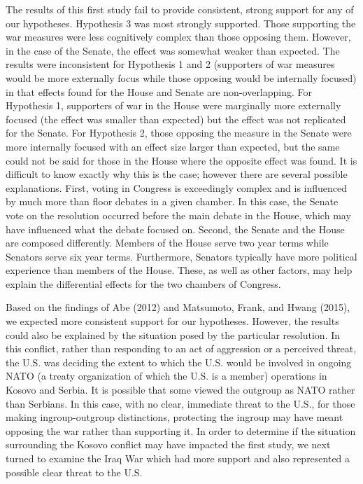 \documentclass[
  english,
  ,man,floatsintext]{apa6}
\begin{document}
The results of this first study fail to provide consistent, strong support for any of our hypotheses. Hypothesis 3 was most strongly supported. Those supporting the war measures were less cognitively complex than those opposing them. However, in the case of the Senate, the effect was somewhat weaker than expected. The results were inconsistent for Hypothesis 1 and 2 (supporters of war measures would be more externally focus while those opposing would be internally focused) in that effects found for the House and Senate are non-overlapping. For Hypothesis 1, supporters of war in the House were marginally more externally focused (the effect was smaller than expected) but the effect was not replicated for the Senate. For Hypothesis 2, those opposing the measure in the Senate were more internally focused with an effect size larger than expected, but the same could not be said for those in the House where the opposite effect was found.
It is difficult to know exactly why this is the case; however there are several possible explanations. First, voting in Congress is exceedingly complex and is influenced by much more than floor debates in a given chamber. In this case, the Senate vote on the resolution occurred before the main debate in the House, which may have influenced what the debate focused on. Second, the Senate and the House are composed differently. Members of the House serve two year terms while Senators serve six year terms. Furthermore, Senators typically have more political experience than members of the House. These, as well as other factors, may help explain the differential effects for the two chambers of Congress.

Based on the findings of Abe (2012) and Matsumoto, Frank, and Hwang (2015), we expected more consistent support for our hypotheses. However, the results could also be explained by the situation posed by the particular resolution. In this conflict, rather than responding to an act of aggression or a perceived threat, the U.S. was deciding the extent to which the U.S. would be involved in ongoing NATO (a treaty organization of which the U.S. is a member) operations in Kosovo and Serbia. It is possible that some viewed the outgroup as NATO rather than Serbians. In this case, with no clear, immediate threat to the U.S., for those making ingroup-outgroup distinctions, protecting the ingroup may have meant opposing the war rather than supporting it. In order to determine if the situation surrounding the Kosovo conflict may have impacted the first study, we next turned to examine the Iraq War which had more support and also represented a possible clear threat to the U.S.
\end{document}
